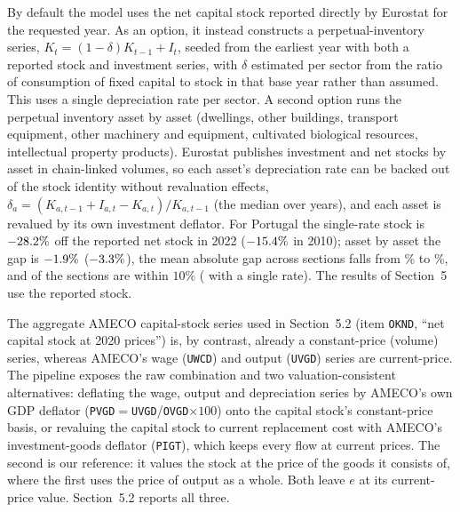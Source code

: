 \documentclass[11pt]{article}
\begin{document}
By default the model uses the net capital stock reported directly by
Eurostat for the requested year. As an option, it instead constructs a
perpetual-inventory series, $K_t = (1-\delta)K_{t-1} + I_t$, seeded from
the earliest year with both a reported stock and investment series, with
$\delta$ estimated per sector from the ratio of consumption of fixed
capital to stock in that base year rather than assumed. This uses a
single depreciation rate per sector. A second option runs the perpetual
inventory asset by asset (dwellings, other buildings, transport
equipment, other machinery and equipment, cultivated biological
resources, intellectual property products). Eurostat publishes
investment and net stocks by asset in chain-linked volumes, so each
asset's depreciation rate can be backed out of the stock identity
without revaluation effects, $\delta_a=(K_{a,t-1}+I_{a,t}-K_{a,t})/K_{a,t-1}$
(the median over years), and each asset is revalued by its own investment
deflator. For Portugal the single-rate stock is
$-28.2\%$ off the reported net stock in 2022
($-15.4\%$ in 2010); asset by asset the gap is
$-1.9\%$ ($-3.3\%$), the mean absolute gap
across sections falls from \PIMSingleMadTwentyTwo\% to
\PIMAssetMadTwentyTwo\%, and \PIMAssetWithinTwentyTwo{} of the
\PIMSections{} sections are within $10\%$ (\PIMSingleWithinTwentyTwo{}
with a single rate). The results of Section~5 use the reported stock.

The aggregate AMECO capital-stock series used in Section~5.2 (item
\texttt{OKND}, ``net capital stock at 2020 prices'') is, by contrast,
already a constant-price (volume) series, whereas AMECO's wage
(\texttt{UWCD}) and output (\texttt{UVGD}) series are current-price. The
pipeline exposes the raw combination and two valuation-consistent
alternatives: deflating the wage, output and depreciation series by
AMECO's own GDP deflator (\texttt{PVGD}$=$\texttt{UVGD}/\texttt{OVGD}$\times100$)
onto the capital stock's constant-price basis, or revaluing the capital
stock to current replacement cost with AMECO's investment-goods deflator
(\texttt{PIGT}), which keeps every flow at current prices. The second is
our reference: it values the stock at the price of the goods it consists
of, where the first uses the price of output as a whole. Both leave $e$
at its current-price value. Section~5.2 reports all three.
\end{document}
